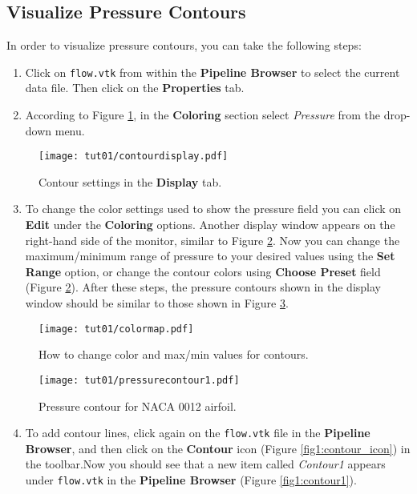 \subsection{Visualize Pressure Contours}
In order to visualize pressure contours, you can take the following steps:
\begin{enumerate}[label=\arabic*)]
    \item Click on \texttt{flow.vtk} from within the \textbf{Pipeline Browser} to select the current data file. Then click on the \textbf{Properties} tab.
    \item According to Figure \ref{fig1:colorby}, in the \textbf{Coloring} section select \textit{Pressure} from the drop-down menu.
\end{enumerate}
\begin{figure}[H]
    \centering
    \texttt{[image: tut01/contourdisplay.pdf]}
    \caption{Contour settings in the \textbf{Display} tab.}
    \label{fig1:colorby}
\end{figure}
\begin{enumerate}[label=\arabic*)]
	\setcounter{enumi}{2}
    \item To change the color settings used to show the pressure field you can click on \textbf{Edit} under the \textbf{Coloring} options. Another display window appears on the right-hand side of the monitor, similar to Figure \ref{fig1:change_color_range}. Now you can change the maximum/minimum range of pressure to your desired values using the \textbf{Set Range} option, or change the contour colors using \textbf{Choose Preset} field (Figure \ref{fig1:change_color_range}). After these steps, the pressure contours shown in the display window should be similar to those shown in Figure \ref{fig1:pressure_contour}.
\end{enumerate}
\begin{figure}[!h]
    \centering
    \texttt{[image: tut01/colormap.pdf]}
    \caption{How to change color and max/min values for contours.}
    \label{fig1:change_color_range}
\end{figure}
\begin{figure}[!h]
    \centering
    \texttt{[image: tut01/pressurecontour1.pdf]}
    \caption{Pressure contour for NACA 0012 airfoil.}
    \label{fig1:pressure_contour}
\end{figure}
\begin{enumerate}[label=\arabic*)]
	\setcounter{enumi}{3}
	\item To add contour lines, click again on the \texttt{flow.vtk} file in the \textbf{Pipeline Browser}, and then click on the \textbf{Contour} icon (Figure \ref{fig1:contour_icon}) in the toolbar.Now you should see that a new item called \textit{Contour1} appears under \texttt{flow.vtk} in the \textbf{Pipeline Browser} (Figure \ref{fig1:contour1}).
\end{enumerate}
